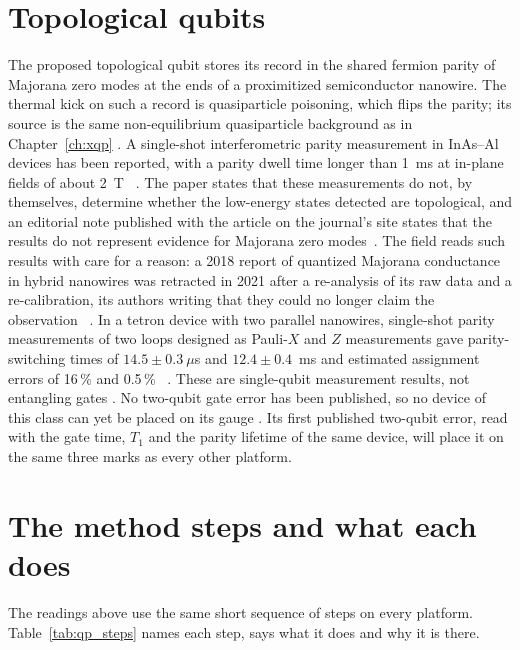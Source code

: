 \section{Topological qubits}\label{sec:qp_topo}
The proposed topological qubit stores its record in the shared fermion parity of Majorana zero modes at the ends of a proximitized
semiconductor nanowire. The thermal kick on such a record is quasiparticle poisoning, which flips the parity; its source is the same
non-equilibrium quasiparticle background as in Chapter~\ref{ch:xqp} \interp. A single-shot interferometric parity measurement in
InAs--Al devices has been reported, with a parity dwell time longer than 1~ms at in-plane fields of about 2~T~\cite{Aghaee2025}
\observed. The paper states that these measurements do not, by themselves, determine whether the low-energy states detected are topological,
and an editorial note published with the article on the journal's site states that the results do not represent evidence for Majorana zero modes~\cite{Aghaee2025}. The field reads such results with care for a reason: a 2018 report of quantized Majorana conductance in hybrid nanowires was retracted
in 2021 after a re-analysis of its raw data and a re-calibration, its authors writing that they could no longer claim the
observation~\cite{Zhang2021Retraction} \observed. In a tetron device with two parallel nanowires, single-shot parity measurements of two
loops designed as Pauli-$X$ and $Z$ measurements gave parity-switching times of $14.5\pm0.3~\mu$s and $12.4\pm0.4$~ms and estimated
assignment errors of 16\,\% and 0.5\,\%~\cite{Tetron2026} \observed. These are single-qubit measurement results, not entangling gates
\interp. No two-qubit
gate error has been published, so no device of this class can yet be placed on its gauge \openprob. Its first published two-qubit error,
read with the gate time, $T_1$ and the parity lifetime of the same device, will place it on the same three marks as every other platform.

\section{The method steps and what each does}\label{sec:qp_steps}
The readings above use the same short sequence of steps on every platform. Table~\ref{tab:qp_steps} names each step, says what it does and
why it is there.

